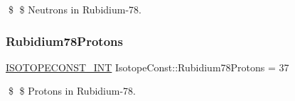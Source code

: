 \$ \$ Neutrons in Rubidium-\/78. \mbox{\label{group___isotope_const-_rubidium-_rb78_ga9feeccd6e1f3205b7519e7318a9b8d6e}} 
\subsubsection{\texorpdfstring{Rubidium78\+Protons}{Rubidium78Protons}}
{\footnotesize\ttfamily \mbox{\hyperlink{group___isotope_const-_macros_ga5f18360b3e99483a35c32d789e62621c}{I\+S\+O\+T\+O\+P\+E\+C\+O\+N\+S\+T\+\_\+\+I\+NT}} Isotope\+Const\+::\+Rubidium78\+Protons = 37}

\$ \$ Protons in Rubidium-\/78. 